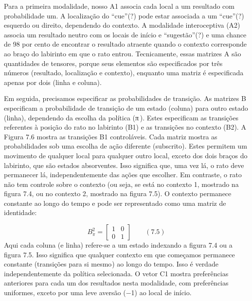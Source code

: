 \documentclass[
  12pt,
]{book}
\begin{document}
Para a primeira modalidade, nosso A1 associa cada local a um resultado com probabilidade um. A localização do ``cue''(?) pode estar associada a um ``cue''(?) esquerdo ou direito, dependendo do contexto. A modalidade interoceptiva (A2) associa um resultado neutro com os locais de início e ``sugestão''(?) e uma chance de 98 por cento de encontrar o resultado atraente quando o contexto corresponde ao braço do labirinto em que o rato entrou. Tecnicamente, essas matrizes A são quantidades de tensores, porque seus elementos são especificados por três números (resultado, localização e contexto), enquanto uma matriz é especificada apenas por dois (linha e coluna).

Em seguida, precisamos especificar as probabilidades de transição. As matrizes B especificam a probabilidade de transição de um estado (coluna) para outro estado (linha), dependendo da escolha da política (π ). Estes especificam as transições referentes à posição do rato no labirinto (B1) e as transições no contexto (B2). A Figura 7.6 mostra as transições B1 controláveis. Cada matriz mostra as probabilidades sob uma escolha de ação diferente (subscrito). Estes permitem um movimento de qualquer local para qualquer outro local, exceto dos dois braços do labirinto, que são estados absorventes. Isso significa que, uma vez lá, o rato deve permanecer lá, independentemente das ações que escolher. Em contraste, o rato não tem controle sobre o contexto (ou seja, se está no contexto 1, mostrado na figura 7.4, ou no contexto 2, mostrado na figura 7.5). O contexto permanece constante ao longo do tempo e pode ser representado como uma matriz de identidade:

\[ B^2_\pi = \begin{bmatrix} 1 & 0 \\ 0 & 1 \end{bmatrix} \qquad (7.5)\]
Aqui cada coluna (e linha) refere-se a um estado indexando a figura 7.4 ou a figura 7.5. Isso significa que qualquer contexto em que começamos permanece constante (transições para si mesmo ) ao longo do tempo. Isso é verdade independentemente da política selecionada. O vetor C1 mostra preferências anteriores para cada um dos resultados nesta modalidade, com preferências uniformes, exceto por uma leve aversão (−1) ao local de início.
\end{document}
